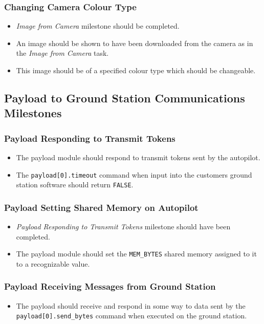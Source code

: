 	\subsubsection{Changing Camera Colour Type}
		\begin{itemize}
			\item 	\emph{Image from Camera} milestone should be completed.
			\item 	An image should be shown to have been downloaded 
				from the camera as in the \emph{Image from Camera}
				task.
			\item 	This image should be of a specified colour type which
				should be changeable.
		\end{itemize}


\subsection{Payload to Ground Station Communications Milestones}
	\subsubsection{Payload Responding to Transmit Tokens}
		\begin{itemize}
			\item 	The payload module should respond to transmit tokens
				sent by the autopilot. 
			\item 	The \verb+payload[0].timeout+ command when input into
				the customers ground station software should return 
				\verb+FALSE+.
		\end{itemize}

	\subsubsection{Payload Setting Shared Memory on Autopilot}
		\begin{itemize}
			\item 	\emph{Payload Responding to Transmit Tokens} milestone
				should have been completed.
			\item 	The payload module should set the \verb+MEM_BYTES+ 
				shared memory assigned to it to a recognizable value.
		\end{itemize}

	\subsubsection{Payload Receiving Messages from Ground Station}
		\begin{itemize}
			\item 	The payload should receive and respond in some way to 
				data sent by the \verb+payload[0].send_bytes+ command
				when executed on the ground station.
		\end{itemize}

